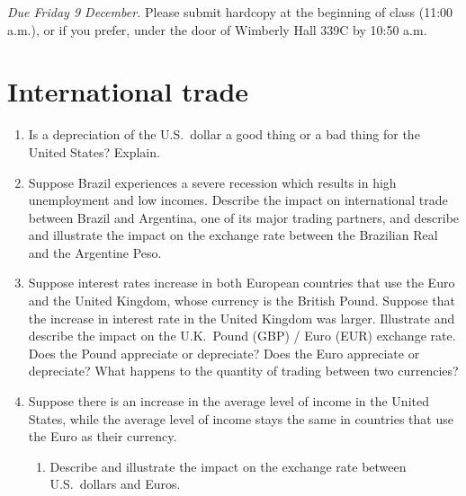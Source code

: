 \documentclass{assignment}
\date{Monday 5 December 2022}
\begin{document}
\RaggedRight

\beginassignment{}

\emph{Due Friday 9 December.} Please submit hardcopy at the beginning of class (11:00 a.m.), or if you prefer, under the door of Wimberly Hall 339C by 10:50 a.m.

\section{International trade}

\begin{enumerate}

\item Is a depreciation of the U.S.~dollar a good thing or a bad thing for the United States? Explain.

\vspace{5.0\baselineskip}

\item Suppose Brazil experiences a severe recession which results in high unemployment and low incomes.
Describe the impact on international trade between Brazil and Argentina, one of its major trading
partners, and describe and illustrate the impact on the exchange rate between the Brazilian Real and
the Argentine Peso.

\vfill

\clearpage

\item Suppose interest rates increase in both European countries that use the Euro and the United Kingdom,
whose currency is the British Pound. Suppose that the increase in interest rate in the United Kingdom
was larger. Illustrate and describe the impact on the U.K.~Pound (GBP) / Euro (EUR) exchange rate.
Does the Pound appreciate or depreciate? Does the Euro appreciate or depreciate? What happens
to the quantity of trading between two currencies?

\vfill

\item Suppose there is an increase in the average level of income in the United States, while the average
level of income stays the same in countries that use the Euro as their currency.

\begin{enumerate}

\item Describe and illustrate the impact on the exchange rate between U.S.~dollars and Euros.

\vfill


\end{enumerate}
\end{enumerate}
\end{document}
